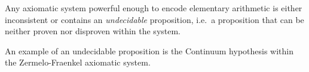 \bt
Any axiomatic system powerful enough to encode elementary arithmetic is either inconsistent or contains an \emph{undecidable} proposition, i.e.\ a proposition that can be neither proven nor disproven within the system.
\et

An example of an undecidable proposition is the Continuum hypothesis within the Zermelo-Fraenkel axiomatic system.  




















